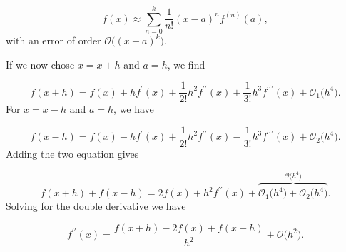\documentclass{emulateapj}
\begin{document}
        \begin{equation*}
            f(x) \approx \sum_{n=0}^{k}\frac{1}{n!}\left(x-a\right)^{n}f^{(n)}(a),
        \end{equation*}
        with an error of order \(\mathcal{O}\big((x-a)^{k}\big)\).
        
        If we now chose \(x = x + h\) and \(a = h\), we find
        
        \begin{equation*}
            f(x+h) = f(x) + hf^{\prime}(x) + \frac{1}{2!}h^{2}f^{\prime\prime}(x) + \frac{1}{3!}h^{3}f^{\prime\prime\prime}(x) + \mathcal{O}_{1}\big(h^{4}\big).
        \end{equation*}
        For \(x = x - h\) and \(a = h\), we have
        
        \begin{equation*}
            f(x-h) = f(x) - hf^{\prime}(x) + \frac{1}{2!}h^{2}f^{\prime\prime}(x) - \frac{1}{3!}h^{3}f^{\prime\prime\prime}(x) + \mathcal{O}_{2}\big(h^{4}\big).
        \end{equation*}
        Adding the two equation gives
        
        \begin{equation*}
            f(x+h) + f(x-h) = 2f(x) + h^{2}f^{\prime\prime}(x) + \overbrace{\mathcal{O}_{1}\big(h^{4}\big) + \mathcal{O}_{2}\big(h^{4}\big)}^{\mathcal{O}\big(h^{4}\big)}.
        \end{equation*}
        Solving for the double derivative we have
        
        \begin{equation*}%
            f^{\prime\prime}(x) = \frac{f(x+h) - 2f(x)+ f(x-h)}{h^{2}} + \mathcal{O}\big(h^{2}\big).
        \end{equation*}
    
\end{document}
